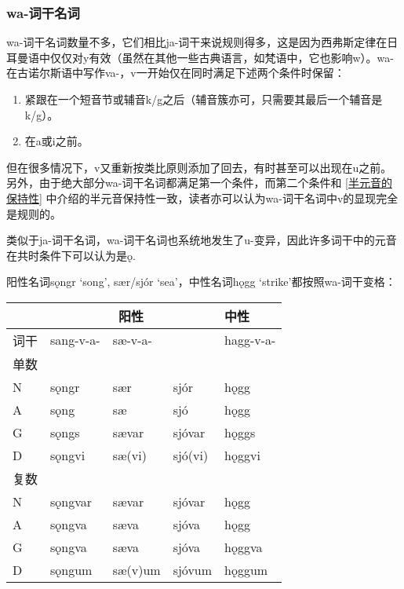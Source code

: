 \subsubsection{wa-词干名词}

wa-词干名词数量不多，它们相比ja-词干来说规则得多，这是因为西弗斯定律在日耳曼语中仅仅对y有效（虽然在其他一些古典语言，如梵语中，它也影响w）。wa-在古诺尔斯语中写作va-，v一开始仅在同时满足下述两个条件时保留：

\begin{enumerate}
  \item
        紧跟在一个短音节或辅音k/g之后（辅音簇亦可，只需要其最后一个辅音是k/g）。
  \item
        在a或i之前。
\end{enumerate}

但在很多情况下，v又重新按类比原则添加了回去，有时甚至可以出现在u之前。另外，由于绝大部分wa-词干名词都满足第一个条件，而第二个条件和 \ref{半元音的保持性} 中介绍的半元音保持性一致，读者亦可以认为wa-词干名词中v的显现完全是规则的。

类似于ja-词干名词，wa-词干名词也系统地发生了u-变异，因此许多词干中的元音在共时条件下可以认为是ǫ.

阳性名词sǫngr `song', sær/sjór `sea'，中性名词hǫgg
`strike'都按照wa-词干变格：

\begin{longtable}{lllll}
  \toprule
     & \multicolumn{3}{c}{\textbf{阳性}} & \textbf{中性}                       \\
  \midrule
  \endhead
  \bottomrule
  \endfoot
  词干 & sang-v-a-                       & sæ-v-a-     &         & hagg-v-a- \\
  单数 &                                 &             &         &           \\
  N  & sǫngr                           & sær         & sjór    & hǫgg      \\
  A  & sǫng                            & sæ          & sjó     & hǫgg      \\
  G  & sǫngs                           & sævar       & sjóvar  & hǫggs     \\
  D  & sǫngvi                          & sæ(vi)      & sjó(vi) & hǫggvi    \\
  复数 &                                 &             &         &           \\
  N  & sǫngvar                         & sævar       & sjóvar  & hǫgg      \\
  A  & sǫngva                          & sæva        & sjóva   & hǫgg      \\
  G  & sǫngva                          & sæva        & sjóva   & hǫggva    \\
  D  & sǫngum                          & sæ(v)um     & sjóvum  & hǫggum    \\
\end{longtable}

